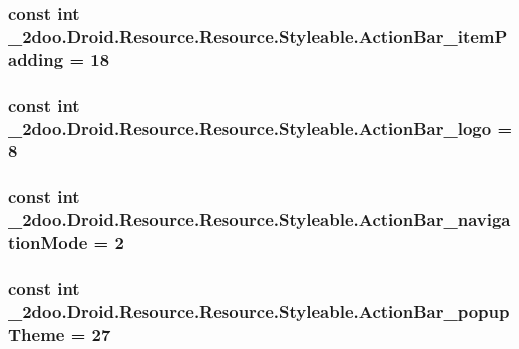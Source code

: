 \hypertarget{class__2doo_1_1_droid_1_1_resource_1_1_styleable_9a7eb5490e21f09823b4079b59a406bd}{
\subsubsection[{ActionBar\_\-itemPadding}]{\setlength{\rightskip}{0pt plus 5cm}const int \_\-2doo.Droid.Resource.Resource.Styleable.ActionBar\_\-itemPadding = 18}}
\label{class__2doo_1_1_droid_1_1_resource_1_1_styleable_9a7eb5490e21f09823b4079b59a406bd}


\hypertarget{class__2doo_1_1_droid_1_1_resource_1_1_styleable_e9537a6daa96b857c7838be4c88b9732}{
\subsubsection[{ActionBar\_\-logo}]{\setlength{\rightskip}{0pt plus 5cm}const int \_\-2doo.Droid.Resource.Resource.Styleable.ActionBar\_\-logo = 8}}
\label{class__2doo_1_1_droid_1_1_resource_1_1_styleable_e9537a6daa96b857c7838be4c88b9732}


\hypertarget{class__2doo_1_1_droid_1_1_resource_1_1_styleable_7c0734574e2de707bfddb8503c8f6aeb}{
\subsubsection[{ActionBar\_\-navigationMode}]{\setlength{\rightskip}{0pt plus 5cm}const int \_\-2doo.Droid.Resource.Resource.Styleable.ActionBar\_\-navigationMode = 2}}
\label{class__2doo_1_1_droid_1_1_resource_1_1_styleable_7c0734574e2de707bfddb8503c8f6aeb}


\hypertarget{class__2doo_1_1_droid_1_1_resource_1_1_styleable_a928ed9e12b38dc3fb0a70d205e7c079}{
\subsubsection[{ActionBar\_\-popupTheme}]{\setlength{\rightskip}{0pt plus 5cm}const int \_\-2doo.Droid.Resource.Resource.Styleable.ActionBar\_\-popupTheme = 27}}
\label{class__2doo_1_1_droid_1_1_resource_1_1_styleable_a928ed9e12b38dc3fb0a70d205e7c079}


